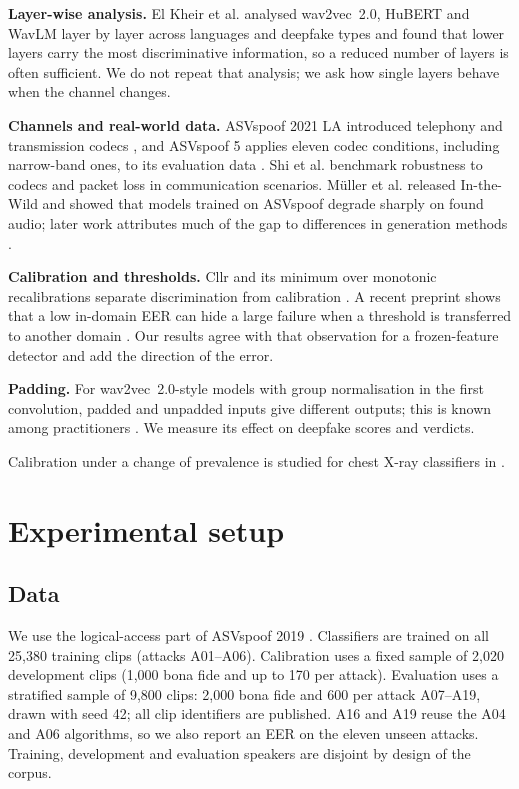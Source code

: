 \documentclass[10pt,a4paper]{article}
\begin{document}
\textbf{Layer-wise analysis.} El Kheir et al. \cite{elkheir2025comprehensive} analysed wav2vec~2.0, HuBERT and WavLM
layer by layer across languages and deepfake types and found that lower layers carry the most discriminative
information, so a reduced number of layers is often sufficient. We do not repeat that analysis; we ask how single
layers behave when the channel changes.

\textbf{Channels and real-world data.} ASVspoof 2021 LA introduced telephony and transmission codecs
\cite{liu2023asvspoof}, and ASVspoof 5 applies eleven codec conditions, including narrow-band ones, to its evaluation
data \cite{wang2026asvspoof5}. Shi et al. \cite{shi2025benchmarking} benchmark robustness to codecs and packet loss in
communication scenarios. M\"uller et al. \cite{muller2022does} released In-the-Wild and showed that models trained on
ASVspoof degrade sharply on found audio; later work attributes much of the gap to differences in generation methods
\cite{muller2024harder}.

\textbf{Calibration and thresholds.} Cllr and its minimum over monotonic recalibrations separate discrimination from
calibration \cite{brummer2006application}. A recent preprint shows that a low in-domain EER can hide a large failure
when a threshold is transferred to another domain \cite{zhou2026eer}. Our results agree with that observation for a
frozen-feature detector and add the direction of the error.

\textbf{Padding.} For wav2vec~2.0-style models with group normalisation in the first convolution, padded and unpadded
inputs give different outputs; this is known among practitioners \cite{hf2023padding}. We measure its effect on
deepfake scores and verdicts.

Calibration under a change of prevalence is studied for chest X-ray classifiers in \cite{hussain2026lung}.

\section{Experimental setup}
\subsection{Data}
We use the logical-access part of ASVspoof 2019 \cite{wang2020asvspoof}. Classifiers are trained on all 25,380
training clips (attacks A01--A06). Calibration uses a fixed sample of 2,020 development clips (1,000 bona fide and up
to 170 per attack). Evaluation uses a stratified sample of 9,800 clips: 2,000 bona fide and 600 per attack A07--A19,
drawn with seed 42; all clip identifiers are published. A16 and A19 reuse the A04 and A06 algorithms, so we also
report an EER on the eleven unseen attacks. Training, development and evaluation speakers are disjoint by design of
the corpus.
\end{document}

